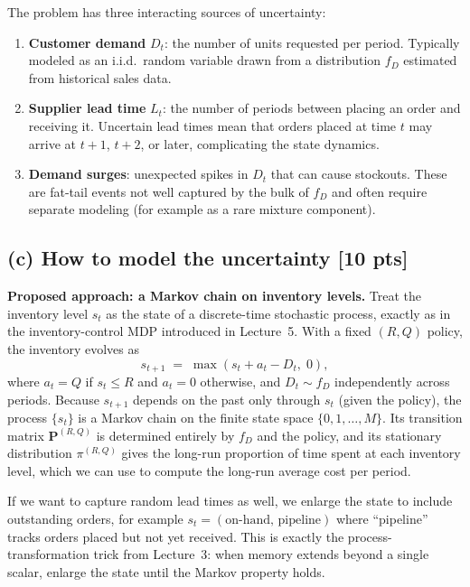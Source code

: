 \documentclass[12pt]{article}
\newcommand{\mat}[1]{\bm{#1}}
\begin{document}
The problem has three interacting sources of uncertainty:
\begin{enumerate}[leftmargin=1.5em,itemsep=2pt]
  \item \textbf{Customer demand} $D_t$: the number of units requested per period. Typically modeled as an i.i.d.\ random variable drawn from a distribution $f_D$ estimated from historical sales data.
  \item \textbf{Supplier lead time} $L_t$: the number of periods between placing an order and receiving it. Uncertain lead times mean that orders placed at time $t$ may arrive at $t+1$, $t+2$, or later, complicating the state dynamics.
  \item \textbf{Demand surges}: unexpected spikes in $D_t$ that can cause stockouts. These are fat-tail events not well captured by the bulk of $f_D$ and often require separate modeling (for example as a rare mixture component).
\end{enumerate}

\subsection*{(c) How to model the uncertainty [10 pts]}

\textbf{Proposed approach: a Markov chain on inventory levels.} Treat the inventory level $s_t$ as the state of a discrete-time stochastic process, exactly as in the inventory-control MDP introduced in Lecture~5. With a fixed $(R, Q)$ policy, the inventory evolves as
\[
  s_{t+1} \;=\; \max\!\left(s_t + a_t - D_t,\; 0\right),
\]
where $a_t = Q$ if $s_t \le R$ and $a_t = 0$ otherwise, and $D_t \sim f_D$ independently across periods. Because $s_{t+1}$ depends on the past only through $s_t$ (given the policy), the process $\{s_t\}$ is a Markov chain on the finite state space $\{0, 1, \dots, M\}$. Its transition matrix $\mat{P}^{(R,Q)}$ is determined entirely by $f_D$ and the policy, and its stationary distribution $\pi^{(R,Q)}$ gives the long-run proportion of time spent at each inventory level, which we can use to compute the long-run average cost per period.

If we want to capture random lead times as well, we enlarge the state to include outstanding orders, for example $s_t = (\text{on-hand},\, \text{pipeline})$ where ``pipeline'' tracks orders placed but not yet received. This is exactly the process-transformation trick from Lecture~3: when memory extends beyond a single scalar, enlarge the state until the Markov property holds.
\end{document}
